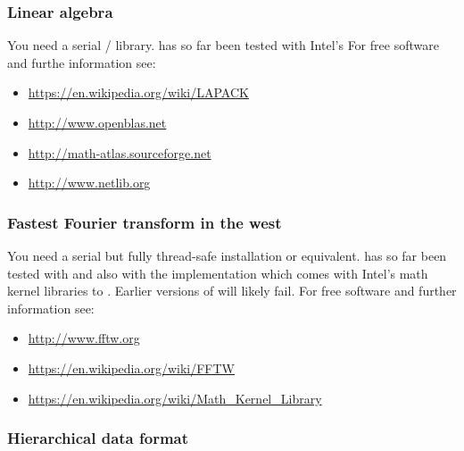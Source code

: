 \documentclass[a4paper, 11pt, DIV=11]{scrartcl}
\begin{document}
\subsubsection{Linear algebra}
\label{sec:linearAlgebra}

You need a serial / library. \nsc has so far been tested with
Intel's 
For free software and furthe information see:
\begin{itemize}
\item \url{https://en.wikipedia.org/wiki/LAPACK}
\item \url{http://www.openblas.net}
\item \url{http://math-atlas.sourceforge.net}
\item \url{http://www.netlib.org}
\end{itemize}

\subsubsection{Fastest Fourier transform in the west}
\label{sec:fftw}

You need a serial but fully thread-safe  installation
or equivalent. \nsc has so far been tested with 
and also with the  implementation which comes with
Intel's math kernel libraries  to .
Earlier versions of  will likely fail.
For free software and further information see:
\begin{itemize}
\item \url{http://www.fftw.org}
\item \url{https://en.wikipedia.org/wiki/FFTW}
\item \url{https://en.wikipedia.org/wiki/Math_Kernel_Library}
\end{itemize}

\subsubsection{Hierarchical data format}
\label{sec:hdf5}
\end{document}
